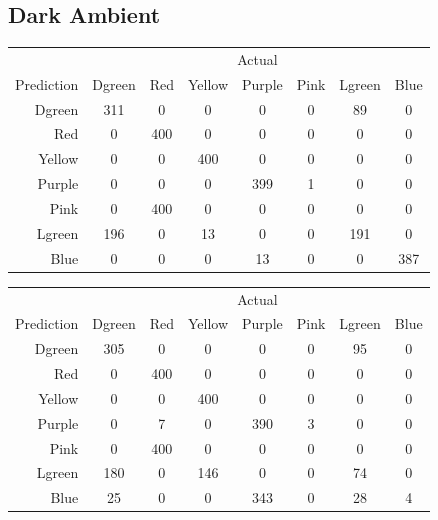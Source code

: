 \documentclass[12pt]{article}
\begin{document}
\subsection*{Dark Ambient}
\begin{center}
    \begin{tabular}{r|ccccccc}
	& \multicolumn{7}{c}{Actual} \\ 
    Prediction      & Dgreen & Red & Yellow & Purple & Pink & Lgreen & Blue \\ \hline
    Dgreen & 311    & 0   & 0      & 0      & 0    & 89     & 0    \\
    Red    & 0      & 400 & 0      & 0      & 0    & 0      & 0    \\
    Yellow & 0      & 0   & 400    & 0      & 0    & 0      & 0    \\
    Purple & 0      & 0   & 0      & 399    & 1    & 0      & 0    \\
    Pink   & 0      & 400 & 0      & 0      & 0    & 0      & 0    \\
    Lgreen & 196    & 0   & 13     & 0      & 0    & 191    & 0    \\
    Blue   & 0      & 0   & 0      & 13     & 0    & 0      & 387  \\
    \end{tabular}

\vspace{1em}

    \begin{tabular}{r|ccccccc}
	& \multicolumn{7}{c}{Actual} \\ 
    Prediction      & Dgreen & Red & Yellow & Purple & Pink & Lgreen & Blue \\ \hline
    Dgreen & 305    & 0   & 0      & 0      & 0    & 95     & 0    \\
    Red    & 0      & 400 & 0      & 0      & 0    & 0      & 0    \\
    Yellow & 0      & 0   & 400    & 0      & 0    & 0      & 0    \\
    Purple & 0      & 7   & 0      & 390    & 3    & 0      & 0    \\
    Pink   & 0      & 400 & 0      & 0      & 0    & 0      & 0    \\
    Lgreen & 180    & 0   & 146    & 0      & 0    & 74     & 0    \\
    Blue   & 25     & 0   & 0      & 343    & 0    & 28     & 4    \\
    \end{tabular}
\end{center}
\end{document}
